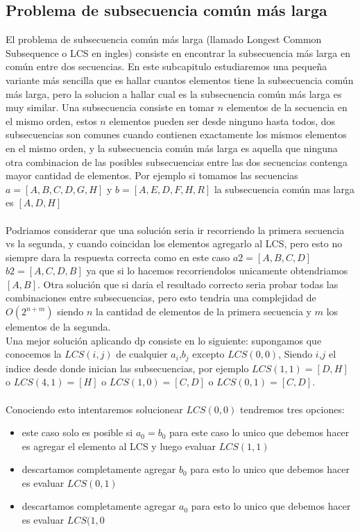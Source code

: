 \subsection{Problema de subsecuencia común más larga}
El problema de subsecuencia común más larga (llamado Longest Common Subsequence o LCS en ingles) consiste en encontrar la subsecuencia más larga en común entre dos secuencias. En este subcapitulo estudiaremos una pequeña variante más sencilla que es hallar cuantos elementos tiene la subsecuencia común más larga, pero la solucion a hallar cual es la subsecuencia común más larga es muy similar. Una subsecuencia consiste en tomar $n$ elementos de la secuencia en el mismo orden, estos $n$ elementos pueden ser desde ninguno hasta todos, dos subsecuencias son comunes cuando contienen exactamente los mismos elementos en el mismo orden, y la subsecuencia común más larga es aquella que ninguna otra combinacion de las posibles subsecuencias entre las dos secuencias contenga mayor cantidad de elementos. Por ejemplo si tomamos las secuencias $a = [A,B,C,D,G,H]$ y $b=[A,E,D,F,H,R]$ la subsecuencia común mas larga es $[A,D,H]$
\\
\\Podriamos considerar que una solución seria ir recorriendo la primera secuencia vs la segunda, y cuando coincidan los elementos agregarlo al LCS, pero esto no siempre dara la respuesta correcta como en este caso $a2=[A,B,C,D]$ $b2=[A,C,D,B]$ ya que si lo hacemos recorriendolos unicamente obtendriamos $[A,B]$. Otra solución que si daria el resultado correcto seria probar todas las combinaciones entre subsecuencias, pero esto tendria una complejidad de $O(2^{n+m})$ siendo $n$ la cantidad de elementos de la primera secuencia y $m$ los elementos de la segunda.
\\Una mejor solución aplicando dp consiste en lo siguiente: supongamos que conocemos la $LCS(i,j)$ de cualquier $a_i$,$b_j$ excepto $LCS(0,0)$, Siendo $i$,$j$ el indice desde donde inician las subsecuencias, por ejemplo $LCS(1,1)=[D,H]$ o $LCS(4,1)=[H]$ o $LCS(1,0)=[C,D]$ o $LCS(0,1)=[C,D]$.
\\ 
\\Conociendo esto intentaremos solucionear $LCS(0,0)$ tendremos tres opciones:
\begin{itemize}
\item este caso solo es posible si $a_0 = b_0$ para este caso lo unico que debemos hacer es agregar el elemento al LCS y luego evaluar $LCS(1,1)$
\item descartamos completamente agregar $b_0$ para esto lo unico que debemos hacer es evaluar $LCS(0,1)$ 
\item descartamos completamente agregar $a_0$ para esto lo unico que debemos hacer es evaluar $LCS(1,0$
\end{itemize}
